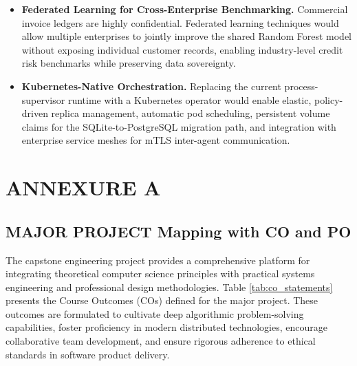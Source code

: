\documentclass[a4paper, 12pt]{report}
\renewcommand{\thetable}{\thechapter.\arabic{table}}
\begin{document}
\begin{itemize}[itemsep=4pt]
    \item \textbf{Federated Learning for Cross-Enterprise Benchmarking.} Commercial invoice ledgers are highly confidential. Federated learning techniques would allow multiple enterprises to jointly improve the shared Random Forest model without exposing individual customer records, enabling industry-level credit risk benchmarks while preserving data sovereignty.

    \item \textbf{Kubernetes-Native Orchestration.} Replacing the current process-supervisor runtime with a Kubernetes operator would enable elastic, policy-driven replica management, automatic pod scheduling, persistent volume claims for the SQLite-to-PostgreSQL migration path, and integration with enterprise service meshes for mTLS inter-agent communication.
\end{itemize}

\appendix


\chapter*{ANNEXURE A}
\renewcommand{\thesection}{A.\arabic{section}}
\renewcommand{\theHsection}{AnnexA.\arabic{section}}
\renewcommand{\thetable}{A.\arabic{table}}
\setcounter{table}{0}
\setcounter{section}{0}

\section{MAJOR PROJECT Mapping with CO and PO}
The capstone engineering project provides a comprehensive platform for integrating theoretical computer science principles with practical systems engineering and professional design methodologies. Table \ref{tab:co_statements} presents the Course Outcomes (COs) defined for the major project. These outcomes are formulated to cultivate deep algorithmic problem-solving capabilities, foster proficiency in modern distributed technologies, encourage collaborative team development, and ensure rigorous adherence to ethical standards in software product delivery.
\end{document}
